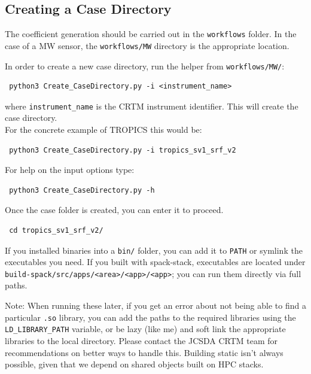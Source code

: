 \subsection{Creating a Case Directory}
The coefficient generation should be carried out in the \verb|workflows| folder.
In the case of a MW sensor, the \verb|workflows/MW| directory is the appropriate location.

In order to create a new case directory, run the helper from \verb|workflows/MW/|:
\begin{verbatim}
 python3 Create_CaseDirectory.py -i <instrument_name>
\end{verbatim}
where \verb|instrument_name| is the CRTM instrument identifier. This will create the case directory.\\
For the concrete example of TROPICS this would be:
\begin{verbatim}
 python3 Create_CaseDirectory.py -i tropics_sv1_srf_v2
\end{verbatim}
For help on the input options type:
\begin{verbatim}
 python3 Create_CaseDirectory.py -h
\end{verbatim}
Once the case folder is created, you can enter it to proceed.
\begin{verbatim}
 cd tropics_sv1_srf_v2/
\end{verbatim}
If you installed binaries into a \verb|bin/| folder, you can add it to \verb|PATH| or symlink the executables you need. If you built with spack-stack, executables are located under \verb|build-spack/src/apps/<area>/<app>/<app>|; you can run them directly via full paths.

Note: When running these later, if you get an error about not being able to find a particular \verb|.so| library, you can add the paths to the required libraries using the \verb|LD_LIBRARY_PATH| variable, or be lazy (like me) and soft link the appropriate libraries to the local directory.   Please contact the JCSDA CRTM team for recommendations on better ways to handle this.   Building static isn't always possible, given that we depend on shared objects built on HPC stacks.

